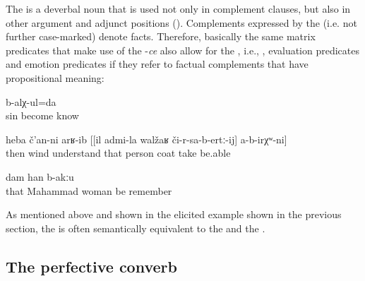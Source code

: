 The  is a deverbal noun that is used not only in complement clauses, but also in other argument and adjunct positions (). Complements expressed by the  (i.e. not further case-marked)  denote facts. Therefore, basically the same matrix predicates that make use of the  -\textit{ce} also allow for the , i.e., , evaluation predicates and emotion predicates if they refer to factual complements that have propositional meaning:
%
\begin{exe}
	\ex	\label{ex:‎‎I know that this will be a sin}
		b-alχ-ul=da\\
		sin	become	know\\
	\glt	{}

	\ex	\label{ex:‎‎‎Then the wind understood that he would not be able to take off the coat of this person}
	\gll	heba	č'an-ni	arʁ-ib	[[il	admi-la	walžaʁ	či-r-sa-b-ertː-ij]	a-b-irχʷ-ni]\\
		then	wind	understand	that	person	coat	take	be.able\\
	\glt	{}

	\ex	\label{ex:‎‎‎I don't remember that she was Mahammad's wife}
		dam	han	b-akːu\\
		that	Mahammad	woman	be		remember	\\
	\glt	{}
\end{exe}

As mentioned above and shown in the elicited example  shown in the previous section, the  is often semantically equivalent to the  and the .
%




\subsection{The perfective converb}
\label{ssec:The preterite converb}

